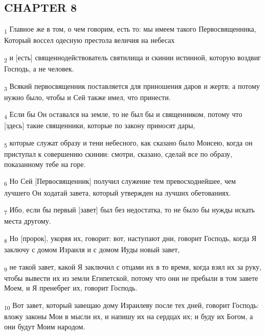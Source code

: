 \subsection{CHAPTER 8}
\begin{tcolorbox}
\textsubscript{1} Главное же в том, о чем говорим, есть то: мы имеем такого Первосвященника, Который воссел одесную престола величия на небесах
\end{tcolorbox}
\begin{tcolorbox}
\textsubscript{2} и [есть] священнодействователь святилища и скинии истинной, которую воздвиг Господь, а не человек.
\end{tcolorbox}
\begin{tcolorbox}
\textsubscript{3} Всякий первосвященник поставляется для приношения даров и жертв; а потому нужно было, чтобы и Сей также имел, что принести.
\end{tcolorbox}
\begin{tcolorbox}
\textsubscript{4} Если бы Он оставался на земле, то не был бы и священником, потому что [здесь] такие священники, которые по закону приносят дары,
\end{tcolorbox}
\begin{tcolorbox}
\textsubscript{5} которые служат образу и тени небесного, как сказано было Моисею, когда он приступал к совершению скинии: смотри, сказано, сделай все по образу, показанному тебе на горе.
\end{tcolorbox}
\begin{tcolorbox}
\textsubscript{6} Но Сей [Первосвященник] получил служение тем превосходнейшее, чем лучшего Он ходатай завета, который утвержден на лучших обетованиях.
\end{tcolorbox}
\begin{tcolorbox}
\textsubscript{7} Ибо, если бы первый [завет] был без недостатка, то не было бы нужды искать места другому.
\end{tcolorbox}
\begin{tcolorbox}
\textsubscript{8} Но [пророк], укоряя их, говорит: вот, наступают дни, говорит Господь, когда Я заключу с домом Израиля и с домом Иуды новый завет,
\end{tcolorbox}
\begin{tcolorbox}
\textsubscript{9} не такой завет, какой Я заключил с отцами их в то время, когда взял их за руку, чтобы вывести их из земли Египетской, потому что они не пребыли в том завете Моем, и Я пренебрег их, говорит Господь.
\end{tcolorbox}
\begin{tcolorbox}
\textsubscript{10} Вот завет, который завещаю дому Израилеву после тех дней, говорит Господь: вложу законы Мои в мысли их, и напишу их на сердцах их; и буду их Богом, а они будут Моим народом.
\end{tcolorbox}
